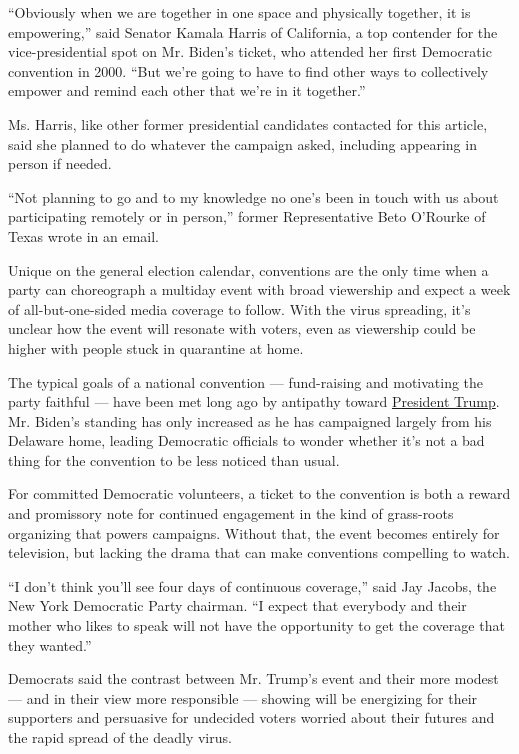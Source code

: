 ``Obviously when we are together in one space and physically together,
it is empowering,'' said Senator Kamala Harris of California, a top
contender for the vice-presidential spot on Mr. Biden's ticket, who
attended her first Democratic convention in 2000. ``But we're going to
have to find other ways to collectively empower and remind each other
that we're in it together.''

Ms. Harris, like other former presidential candidates contacted for this
article, said she planned to do whatever the campaign asked, including
appearing in person if needed.

``Not planning to go and to my knowledge no one's been in touch with us
about participating remotely or in person,'' former Representative Beto
O'Rourke of Texas wrote in an email.

Unique on the general election calendar, conventions are the only time
when a party can choreograph a multiday event with broad viewership and
expect a week of all-but-one-sided media coverage to follow. With the
virus spreading, it's unclear how the event will resonate with voters,
even as viewership could be higher with people stuck in quarantine at
home.

The typical goals of a national convention --- fund-raising and
motivating the party faithful --- have been met long ago by antipathy
toward
\href{https://www.nytimes3xbfgragh.onion/interactive/2020/us/elections/donald-trump.html}{President
Trump}. Mr. Biden's standing has only increased as he has campaigned
largely from his Delaware home, leading Democratic officials to wonder
whether it's not a bad thing for the convention to be less noticed than
usual.

For committed Democratic volunteers, a ticket to the convention is both
a reward and promissory note for continued engagement in the kind of
grass-roots organizing that powers campaigns. Without that, the event
becomes entirely for television, but lacking the drama that can make
conventions compelling to watch.

``I don't think you'll see four days of continuous coverage,'' said Jay
Jacobs, the New York Democratic Party chairman. ``I expect that
everybody and their mother who likes to speak will not have the
opportunity to get the coverage that they wanted.''

Democrats said the contrast between Mr. Trump's event and their more
modest --- and in their view more responsible --- showing will be
energizing for their supporters and persuasive for undecided voters
worried about their futures and the rapid spread of the deadly virus.

